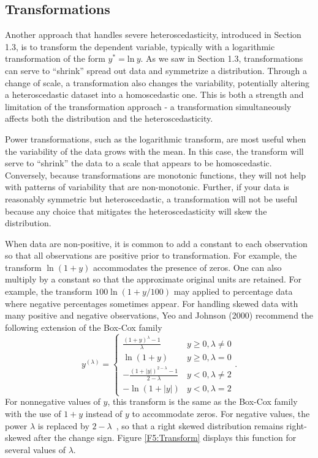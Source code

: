 \subsection{Transformations}\label{S5:Transformations}

Another approach that handles severe heteroscedasticity, introduced
in Section 1.3, is to transform the dependent variable, typically
with a logarithmic transformation of the form $y^{\ast} =
\mathrm{ln~}y$. As we saw in Section 1.3, transformations can serve
to ``shrink'' spread out data and symmetrize a distribution. Through
a change of scale, a transformation also changes the variability,
potentially altering a heteroscedastic dataset into a homoscedastic
one. This is both a strength and limitation of the transformation
approach - a transformation simultaneously affects both the
distribution and the heteroscedasticity.


Power transformations, such as the logarithmic transform, are most
useful when the variability of the data grows with the mean. In this
case, the transform will serve to ``shrink'' the data to a scale
that appears to be homoscedastic. Conversely, because
transformations are monotonic functions, they will not help with
patterns of variability that are non-monotonic. Further, if your
data is reasonably symmetric but heteroscedastic, a transformation
will not be useful because any choice that mitigates the
heteroscedasticity will skew the distribution.

When data are non-positive, it is common to add a constant to each
observation so that all observations are positive prior to
transformation. For example, the transform $\ln (1+y)$ accommodates
the presence of zeros. One can also multiply by a constant so that
the approximate original units are retained. For example, the
transform $100\ln (1+y/100)$ may applied to percentage data where
negative percentages sometimes appear. For handling skewed data with
many positive and negative observations, Yeo and Johnson (2000)
recommend the following extension of the Box-Cox family
\begin{equation*}
y^{(\lambda )}=\left\{
\begin{array}{ll}
\frac{(1+y)^{\lambda }-1}{\lambda } & y\geq 0,\lambda \neq 0 \\
\ln (1+y) & y\geq 0,\lambda =0 \\
-\frac{(1+|y|)^{2-\lambda }-1}{2-\lambda } & y<0,\lambda \neq 2 \\
-\ln (1+|y|) & y<0,\lambda =2%
\end{array}%
\right. .
\end{equation*}%
For nonnegative values of $y$, this transform is the same as the
Box-Cox family with the use of $1+y$ instead of $y$ to accommodate
zeros. For negative values, the power $\lambda $ is replaced by
$2-\lambda $\ , so that a right skewed distribution remains
right-skewed after the change sign. Figure \ref{F5:Transform}
displays this function for several values of $\lambda $.


